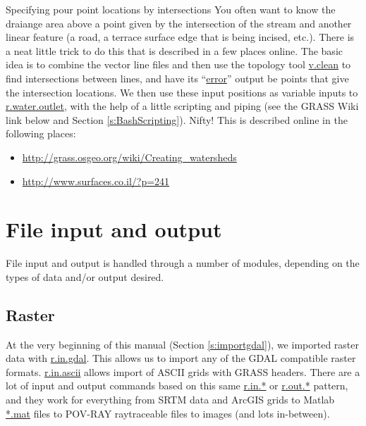 \documentclass{book}
\begin{document}
\begin{boxx}[!ht]
\begin{bclogo}[arrondi = 0.1, logo = \bcrosevents]{Specifying pour point locations by intersections}
You often want to know the draiange area above a point given by the intersection of the stream and another linear feature (a road, a terrace surface edge that is being incised, etc.). There is a neat little trick to do this that is described in a few places online. The basic idea is to combine the vector line files and then use the topology tool \url{v.clean} to find intersections between lines, and have its ``\url{error}'' output be points that give the intersection locations. We then use these input positions as variable inputs to \url{r.water.outlet}, with the help of a little scripting and piping (see the GRASS Wiki link below and Section \ref{s:BashScripting}). Nifty! This is described online in the following places:
\begin{itemize}
 \item \url{http://grass.osgeo.org/wiki/Creating_watersheds}
 \item \url{http://www.surfaces.co.il/?p=241}
\end{itemize}
\end{bclogo}
\caption{Specifying pour point locations by intersections}
\end{boxx}

\chapter{File input and output \label{s:FIO}}

File input and output is handled through a number of modules, depending on the types of data and/or output desired.

\section{Raster \label{s:FIOrast}}

At the very beginning of this manual (Section \ref{s:importgdal}), we imported raster data with \url{r.in.gdal}. This allows us to import any of the GDAL compatible raster formats. \url{r.in.ascii} allows import of ASCII grids with GRASS headers. There are a lot of input and output commands based on this same \url{r.in.*} or \url{r.out.*} pattern, and they work for everything from SRTM data and ArcGIS grids to Matlab \url{*.mat} files to POV-RAY raytraceable files to images (and lots in-between).
\end{document}
